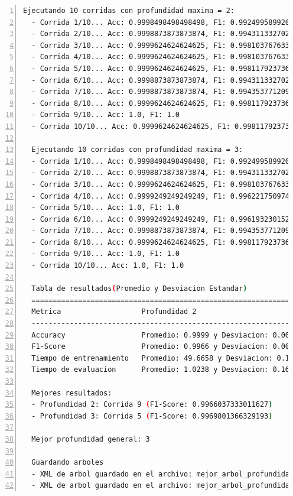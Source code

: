 \documentclass[12pt,a4paper]{article}
\begin{document}
    \begin{lstlisting}[language=bash, numbers=left, basicstyle=\ttfamily\tiny,label={lst:lstlisting7}]
  Ejecutando 10 corridas con profundidad maxima = 2:
  - Corrida 1/10... Acc: 0.9998498498498498, F1: 0.992499589920044
  - Corrida 2/10... Acc: 0.9998873873873874, F1: 0.9943113327026367
  - Corrida 3/10... Acc: 0.9999624624624625, F1: 0.9981037676334381
  - Corrida 4/10... Acc: 0.9999624624624625, F1: 0.9981037676334381
  - Corrida 5/10... Acc: 0.9999624624624625, F1: 0.9981179237365723
  - Corrida 6/10... Acc: 0.9998873873873874, F1: 0.9943113327026367
  - Corrida 7/10... Acc: 0.9998873873873874, F1: 0.9943537712097168
  - Corrida 8/10... Acc: 0.9999624624624625, F1: 0.9981179237365723
  - Corrida 9/10... Acc: 1.0, F1: 1.0
  - Corrida 10/10... Acc: 0.9999624624624625, F1: 0.9981179237365723

  Ejecutando 10 corridas con profundidad maxima = 3:
  - Corrida 1/10... Acc: 0.9998498498498498, F1: 0.992499589920044
  - Corrida 2/10... Acc: 0.9998873873873874, F1: 0.9943113327026367
  - Corrida 3/10... Acc: 0.9999624624624625, F1: 0.9981037676334381
  - Corrida 4/10... Acc: 0.9999249249249249, F1: 0.9962217509746552
  - Corrida 5/10... Acc: 1.0, F1: 1.0
  - Corrida 6/10... Acc: 0.9999249249249249, F1: 0.9961932301521301
  - Corrida 7/10... Acc: 0.9998873873873874, F1: 0.9943537712097168
  - Corrida 8/10... Acc: 0.9999624624624625, F1: 0.9981179237365723
  - Corrida 9/10... Acc: 1.0, F1: 1.0
  - Corrida 10/10... Acc: 1.0, F1: 1.0

  Tabla de resultados(Promedio y Desviacion Estandar)
  ================================================================================
  Metrica                   Profundidad 2                         Profundidad 3
  --------------------------------------------------------------------------------
  Accuracy                  Promedio: 0.9999 y Desviacion: 0.0000 Promedio: 0.9999 y Desviacion: 0.0001
  F1-Score                  Promedio: 0.9966 y Desviacion: 0.0024 Promedio: 0.9970 y Desviacion: 0.0026
  Tiempo de entrenamiento   Promedio: 49.6658 y Desviacion: 0.1351 Promedio: 49.3974 y Desviacion: 0.6602
  Tiempo de evaluacion      Promedio: 1.0238 y Desviacion: 0.1602 Promedio: 1.0434 y Desviacion: 0.1286

  Mejores resultados:
  - Profundidad 2: Corrida 9 (F1-Score: 0.9966037333011627)
  - Profundidad 3: Corrida 5 (F1-Score: 0.9969801366329193)

  Mejor profundidad general: 3

  Guardando arboles
  - XML de arbol guardado en el archivo: mejor_arbol_profundidad_2.xml
  - XML de arbol guardado en el archivo: mejor_arbol_profundidad_3.xml
    \end{lstlisting}
\end{document}
